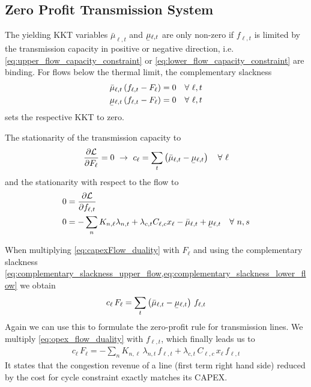 \documentclass[11pt,twocolumn]{article}
\newcommand{\ubar}[1]{\underaccent{\bar}{#1}}
\newcommand{\Forall}[1]{\hspace{10pt} \forall \,\, #1 }
\newcommand{\pdv}[2]{\frac{\partial #1}{\partial #2}}
\newcommand{\flow}{f_{\ell,t}}
\newcommand{\capacityflow}{F_{\ell}}
\newcommand{\capitalpriceflow}{c_{\ell}}
\newcommand{\mulowerflow}{\ubar{\mu}_{\ell,t}}
\newcommand{\muupperflow}{\bar{\mu}_{\ell,t}}
\newcommand{\lagrangian}{\mathcal{L}}
\newcommand{\lmp}[1][n]{\lambda_{#1,t}}
\newcommand{\incidence}[1][n]{K_{#1,\ell}}
\newcommand{\cycle}{C_{\ell,c}}
\newcommand{\reactance}{x_\ell}
\newcommand{\cycleprice}{\lambda_{c,t}}
\begin{document}
\subsection{Zero Profit Transmission System}
\label{sec:zero_profit_flow}

The yielding KKT variables $\muupperflow$ and $\mulowerflow$ are only non-zero if $\flow$ is limited by the transmission capacity in positive or negative direction, i.e. \cref{eq:upper_flow_capacity_constraint} or \cref{eq:lower_flow_capacity_constraint} are binding. For flows below the thermal limit, the complementary slackness 
\begin{align}
\muupperflow \left( \flow - \capacityflow \right)  &= 0 \Forall{\ell,t}
\label{eq:complementary_slackness_upper_flow} \\
\mulowerflow \left( \flow - \capacityflow \right) &=  0 \Forall{\ell,t}
\label{eq:complementary_slackness_lower_flow} 
\end{align}
sets the respective KKT to zero. 

The stationarity of the transmission capacity to
\begin{align}
\pdv{\lagrangian}{\capacityflow} = 0 \,\, \rightarrow \,\, 
\capitalpriceflow =  \sum_t \left( \muupperflow - \mulowerflow \right) \Forall{\ell}
\label{eq:capexFlow_duality}
\end{align}
and the stationarity with respect to the flow to
\begin{align}
    0 &= \pdv{\lagrangian}{\flow}  \\ 
    0 &= - \sum_n \incidence \lmp  + \cycleprice \cycle \reactance  - \muupperflow + \mulowerflow \Forall{n,s} \label{eq:opex_flow_duality}
\end{align}
    
    
When multiplying \cref{eq:capexFlow_duality} with $\capacityflow$ and using the complementary slackness \cref{eq:complementary_slackness_upper_flow,eq:complementary_slackness_lower_flow} we obtain 
\begin{align}
 \capitalpriceflow \, \capacityflow = \sum_t \left( \muupperflow - \mulowerflow \right)  \, \flow
 \label{eq:capital_price_flow_sum}
\end{align}
Again we can use this to formulate the zero-profit rule for transmission lines. We multiply \cref{eq:opex_flow_duality} with $\flow$, which finally leads us to 
\begin{align}
\capitalpriceflow \, \capacityflow = - \sum_n \incidence\, \lmp\, \flow + \cycleprice\, \cycle\, \reactance\, \flow 
\end{align}
It states that the congestion revenue of a line (first term right hand side) reduced by the cost for cycle constraint exactly matches its CAPEX. 
\end{document}
